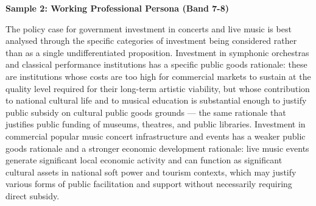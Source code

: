 \textbf{Sample 2: Working Professional Persona (Band 7-8)}

The policy case for government investment in concerts and live music is best analysed through the specific categories of investment being considered rather than as a single undifferentiated proposition. Investment in symphonic orchestras and classical performance institutions has a specific public goods rationale: these are institutions whose costs are too high for commercial markets to sustain at the quality level required for their long-term artistic viability, but whose contribution to national cultural life and to musical education is substantial enough to justify public subsidy on cultural public goods grounds — the same rationale that justifies public funding of museums, theatres, and public libraries. Investment in commercial popular music concert infrastructure and events has a weaker public goods rationale and a stronger economic development rationale: live music events generate significant local economic activity and can function as significant cultural assets in national soft power and tourism contexts, which may justify various forms of public facilitation and support without necessarily requiring direct subsidy.

\separator


